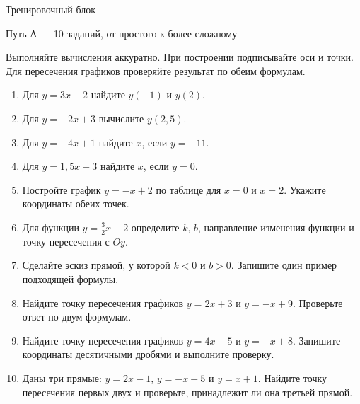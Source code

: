 \documentclass[a4paper,12pt]{article}
\begin{document}
\begin{center}
{\Large\color{deepaccent}Тренировочный блок}\par
\vspace{2mm}
{\small Путь А --- 10 заданий, от простого к более сложному}
\end{center}
\vspace{2mm}
Выполняйте вычисления аккуратно. При построении подписывайте оси и точки. Для пересечения графиков проверяйте результат по обеим формулам.
\begin{enumerate}[label=\textbf{\arabic*.}]
\item Для $y=3x-2$ найдите $y(-1)$ и $y(2)$.
\item Для $y=-2x+3$ вычислите $y(2{,}5)$.
\item Для $y=-4x+1$ найдите $x$, если $y=-11$.
\item Для $y=1{,}5x-3$ найдите $x$, если $y=0$.
\item Постройте график $y=-x+2$ по таблице для $x=0$ и $x=2$. Укажите координаты обеих точек.
\item Для функции $y=\frac32x-2$ определите $k$, $b$, направление изменения функции и точку пересечения с $Oy$.
\item Сделайте эскиз прямой, у которой $k<0$ и $b>0$. Запишите один пример подходящей формулы.
\item Найдите точку пересечения графиков $y=2x+3$ и $y=-x+9$. Проверьте ответ по двум формулам.
\item Найдите точку пересечения графиков $y=4x-5$ и $y=-x+8$. Запишите координаты десятичными дробями и выполните проверку.
\item Даны три прямые: $y=2x-1$, $y=-x+5$ и $y=x+1$. Найдите точку пересечения первых двух и проверьте, принадлежит ли она третьей прямой.
\end{enumerate}
\clearpage
\end{document}
